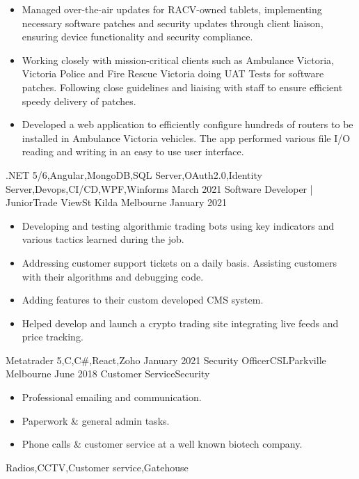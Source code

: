 \begin{experiences}
{\begin{itemize}
                        \item Managed over-the-air updates for RACV-owned tablets, implementing necessary software patches and security updates through client liaison, ensuring device functionality and security compliance.
                        \item Working closely with mission-critical clients such as Ambulance Victoria, Victoria Police and Fire Rescue Victoria doing UAT Tests for software patches. Following close guidelines and liaising with staff to ensure efficient speedy delivery of patches.
                        \item Developed a web application to efficiently configure hundreds of routers to be installed in Ambulance Victoria vehicles. The app performed various file I/O reading and writing in an easy to use user interface.
                      \end{itemize}
                    }
                    {.NET 5/6,Angular,MongoDB,SQL Server,OAuth2.0,Identity Server,Devops,CI/CD,WPF,Winforms}
  \emptySeparator
  \experience
    {March 2021}     {Software Developer | Junior}{Trade View}{St Kilda Melbourne}
    {January 2021}    {
                      \begin{itemize}
                        \item Developing and testing algorithmic trading bots using key indicators and various tactics learned during the job.
                        \item Addressing customer support tickets on a daily basis. Assisting customers with their algorithms and debugging code.
                        \item Adding features to their custom developed CMS system.
                        \item Helped develop and launch a crypto trading site integrating live feeds and price tracking. 
                      \end{itemize}
                    }
                    {Metatrader 5,C,C\#,React,Zoho}
  \emptySeparator
  \consultantexperience
  {January 2021}       {Security Officer}{CSL}{Parkville Melbourne}
  {June 2018}      {Customer Service}{Security}
                    {
                      \begin{itemize}
                        \item Professional emailing and communication.
                        \item Paperwork \& general admin tasks.
                        \item Phone calls \& customer service at a well known biotech company.
                      \end{itemize}
                    }
                    {Radios,CCTV,Customer service,Gatehouse}
  \emptySeparator
\end{experiences}
